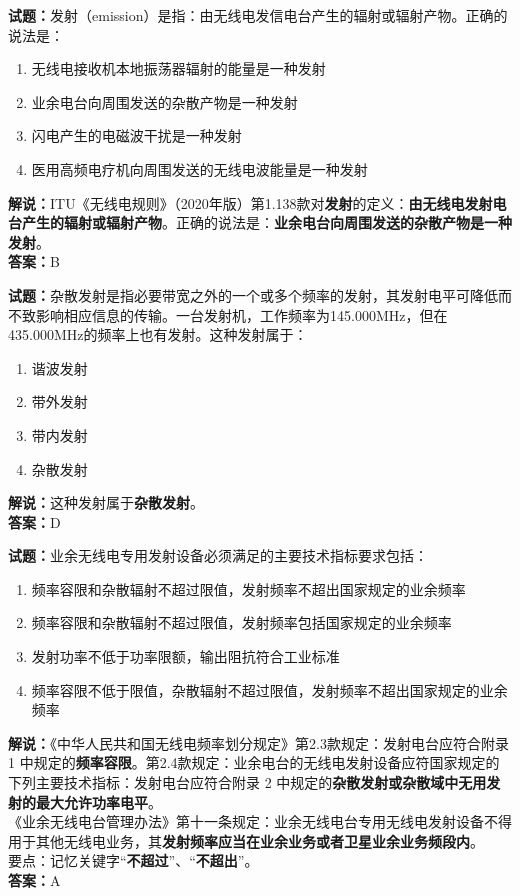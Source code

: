 \documentclass{ctexbook}
\begin{document}
\bigskip


\noindent\textbf{试题：}发射（emission）是指：由无线电发信电台产生的辐射或辐射产物。正确的说法是：
\begin{enumerate}[leftmargin=3em]
	\item 无线电接收机本地振荡器辐射的能量是一种发射
	\item 业余电台向周围发送的杂散产物是一种发射
	\item 闪电产生的电磁波干扰是一种发射
	\item 医用高频电疗机向周围发送的无线电波能量是一种发射
\end{enumerate}
\noindent\textbf{解说：}ITU《无线电规则》（2020年版）第1.138款对\textbf{发射}的定义：\textbf{由无线电发射电台产生的辐射或辐射产物}。正确的说法是：\textbf{业余电台向周围发送的杂散产物是一种发射}。\\\noindent\textbf{答案：}B


\bigskip


\noindent\textbf{试题：}杂散发射是指必要带宽之外的一个或多个频率的发射，其发射电平可降低而不致影响相应信息的传输。一台发射机，工作频率为145.000\si{\MHz}，但在435.000\si{\MHz}的频率上也有发射。这种发射属于：
\begin{enumerate}[leftmargin=3em]
	\item 谐波发射
	\item 带外发射
	\item 带内发射
	\item 杂散发射
\end{enumerate}
\noindent\textbf{解说：}这种发射属于\textbf{杂散发射}。\\\noindent\textbf{答案：}D


\bigskip


\noindent\textbf{试题：}业余无线电专用发射设备必须满足的主要技术指标要求包括：
\begin{enumerate}[leftmargin=3em]
	\item 频率容限和杂散辐射不超过限值，发射频率不超出国家规定的业余频率
	\item 频率容限和杂散辐射不超过限值，发射频率包括国家规定的业余频率
	\item 发射功率不低于功率限额，输出阻抗符合工业标准
	\item 频率容限不低于限值，杂散辐射不超过限值，发射频率不超出国家规定的业余频率
\end{enumerate}
\noindent\textbf{解说：}《中华人民共和国无线电频率划分规定》第2.3款规定：发射电台应符合附录 1 中规定的\textbf{频率容限}。第2.4款规定：业余电台的无线电发射设备应符国家规定的下列主要技术指标：发射电台应符合附录 2 中规定的\textbf{杂散发射或杂散域中无用发射的最大允许功率电平}。\\《业余无线电台管理办法》第十一条规定：业余无线电台专用无线电发射设备不得用于其他无线电业务，其\textbf{发射频率应当在业余业务或者卫星业余业务频段内}。\\要点：记忆关键字“\textbf{不超过}”、“\textbf{不超出}”。\\\noindent\textbf{答案：}A
\end{document}
